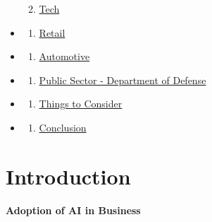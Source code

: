 \documentclass[
]{article}
\providecommand{\tightlist}{%
  \setlength{\itemsep}{0pt}\setlength{\parskip}{0pt}}
\begin{document}
\begin{itemize}
\begin{enumerate}
  \def\labelenumi{\arabic{enumi}.}
  \setcounter{enumi}{5}
  \tightlist
  \item
    \href{https://tmittala.github.io/Recipe_for_Success/tech.html}{Tech}
  \end{enumerate}
\item
  \begin{enumerate}
  \def\labelenumi{\arabic{enumi}.}
  \setcounter{enumi}{6}
  \tightlist
  \item
    \href{https://tmittala.github.io/Recipe_for_Success/retail.html}{Retail}
  \end{enumerate}
\item
  \begin{enumerate}
  \def\labelenumi{\arabic{enumi}.}
  \setcounter{enumi}{7}
  \tightlist
  \item
    \href{https://tmittala.github.io/Recipe_for_Success/automotive.html}{Automotive}
  \end{enumerate}
\item
  \begin{enumerate}
  \def\labelenumi{\arabic{enumi}.}
  \setcounter{enumi}{8}
  \tightlist
  \item
    \href{https://tmittala.github.io/Recipe_for_Success/public-sector---department-of-defense.html}{Public Sector - Department of Defense}
  \end{enumerate}
\item
  \begin{enumerate}
  \def\labelenumi{\arabic{enumi}.}
  \setcounter{enumi}{9}
  \tightlist
  \item
    \href{https://tmittala.github.io/Recipe_for_Success/things-to-consider.html}{Things to Consider}
  \end{enumerate}
\item
  \begin{enumerate}
  \def\labelenumi{\arabic{enumi}.}
  \setcounter{enumi}{10}
  \tightlist
  \item
    \href{https://tmittala.github.io/Recipe_for_Success/conclusion-1.html}{Conclusion}
  \end{enumerate}
\end{itemize}

\hypertarget{introduction}{%
\section{Introduction}\label{introduction}}

\textbf{Adoption of AI in Business}
\end{document}
